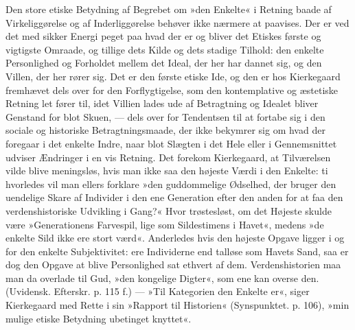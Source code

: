 \documentclass[12pt,a4paper,openany]{book}
\newcommand{\opage}[1]{\marginnote{\footnotesize\textit{[#1]}}}
\begin{document}
Den store etiske Betydning af Begrebet om »den
Enkelte« i Retning baade af Virkeliggørelse og af Inderliggørelse
behøver ikke nærmere at paavises. Der er ved
det med sikker Energi peget paa hvad der er og bliver
det Etiskes første og vigtigste Omraade, og tillige dets
Kilde og dets stadige Tilhold: den enkelte Personlighed
og Forholdet mellem det Ideal, der her har dannet sig,
og den Villen, der her rører sig. Det er den første etiske
Ide, og den er hos Kierkegaard fremhævet dels over for
den Forflygtigelse, som den kontemplative og æstetiske
Retning let fører til, idet Villien lades ude af Betragtning
og Idealet bliver Genstand for blot Skuen, --- dels
over for Tendentsen til at fortabe sig i den sociale og
historiske Betragtningsmaade, der ikke bekymrer sig om
hvad der foregaar i det enkelte Indre, naar blot Slægten
i det Hele eller i Gennemsnittet udviser Ændringer i en
vis Retning. Det forekom Kierkegaard, at Tilværelsen
vilde blive meningsløs, hvis man ikke saa den højeste
Værdi i den Enkelte: ti hvorledes vil man ellers forklare
»den guddommelige Ødselhed, der bruger den uendelige
Skare af Individer i den ene Generation efter den anden
\opage{103}for at faa den verdenshistoriske Udvikling i Gang?« Hvor
trøstesløst, om det Højeste skulde være »Generationens
Farvespil, lige som Sildestimens i Havet«, medens »de
enkelte Sild ikke ere stort værd«. Anderledes hvis den
højeste Opgave ligger i og for den enkelte Subjektivitet:
ere Individerne end talløse som Havets Sand, saa
er dog den Opgave at blive Personlighed sat ethvert af
dem. Verdenshistorien maa man da overlade til Gud,
»den kongelige Digter«, som ene kan overse den. (Uvidensk.
Efterskr. p. 115 f.) --- »Til Kategorien den Enkelte
er«, siger Kierkegaard med Rette i sin »Rapport til Historien«
(Synspunktet. p. 106), »min mulige etiske Betydning
ubetinget knyttet«.
\end{document}
